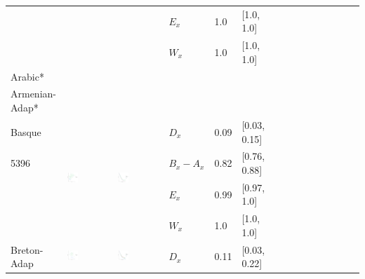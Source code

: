\documentclass[11pt,letterpaper]{article}
\begin{document}
\begin{longtable}{lllllllllllllll}
  &    &    &  $E_x$  &  1.0  &  [1.0, 1.0]  \\ 
  &    &    &  $W_x$  &  1.0  &  [1.0, 1.0]  \\ [10.25ex] \hline
Arabic*  &\\ [10.25ex] \hline
Armenian-Adap*  &\\ [10.25ex] \hline
Basque  &  \multirow{4}{*}{\includegraphics[width=0.25\textwidth]{figures/Basque-entropy-memory.pdf}}  &  \multirow{4}{*}{\includegraphics[width=0.25\textwidth]{figures/Basque-listener-surprisal-memory.pdf}}  &  $D_x$  &  0.09  &  [0.03, 0.15]  \\ 
5396  &    &    &  $B_x-A_x$  &  0.82  &  [0.76, 0.88]  \\ 
  &    &    &  $E_x$  &  0.99  &  [0.97, 1.0]  \\ 
  &    &    &  $W_x$  &  1.0  &  [1.0, 1.0]  \\ [10.25ex] \hline
Breton-Adap  &  \multirow{4}{*}{\includegraphics[width=0.25\textwidth]{figures/Breton-Adap-entropy-memory.pdf}}  &  \multirow{4}{*}{\includegraphics[width=0.25\textwidth]{figures/Breton-Adap-listener-surprisal-memory.pdf}}  &  $D_x$  &  0.11  &  [0.03, 0.22]  \\ 

\end{longtable}
\end{document}
